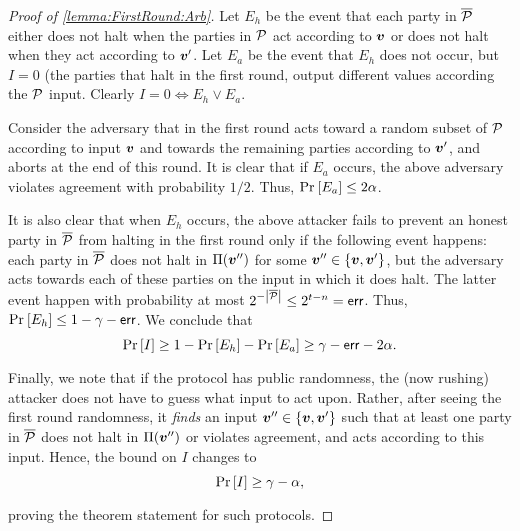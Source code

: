 \begin{proof}[Proof of \cref{lemma:FirstRound:Arb}]
  Let $E_h$ be the event that  each party  in ${\overline{\mathcal{P}}}$ either does not halt when the parties in $\mathcal{P}$ act according to ${ \boldsymbol{v}}$ or does not halt when they act according to ${ \boldsymbol{v}}'$. Let $E_a$ be the event that $E_h$ does not occur, but $I = 0$  (\ie the parties that halt in the first round, output different values according the $\mathcal{P}$ input.  Clearly $I = 0  \Longleftrightarrow E_h \lor  E_a$.

Consider the  adversary  that in the first round acts toward a random subset of $\mathcal{P}$ according to input ${ \boldsymbol{v}}$ and towards the remaining parties according to  ${ \boldsymbol{v}}'$, and  aborts at the end of this  round. It is  clear that  if $E_a$ occurs, the  above adversary violates agreement with probability $1/2$. Thus, $\Pr_{}\left[E_a\right] \le 2\alpha$.

It is also clear that when $E_h$ occurs, the above attacker  fails to prevent an honest party
in ${\overline{\mathcal{P}}}$ from halting in the first round only if the following event happens:  each party in ${\overline{\mathcal{P}}} $ does not halt in $\Pi({ \boldsymbol{v}}'')$ for some ${ \boldsymbol{v}}'' \in \left\{{ \boldsymbol{v}},{ \boldsymbol{v}}'\right\}$, but the adversary acts towards each of these parties on the input in which it does halt. The latter event happen with probability at most  $2^{-\left|{\overline{\mathcal{P}}}\right|} \le 2^{t-n} = \mathsf{err}$. Thus, $\Pr_{}\left[E_h\right] \le 1 - \gamma - \mathsf{err}$. We conclude that
\begin{align*}
	\Pr_{}\left[I\right] \ge  1 - \Pr_{}\left[E_h\right] - \Pr_{}\left[E_a\right] \ge \gamma - \mathsf{err}  - 2\alpha.
\end{align*}
Finally, we note that if the protocol has public randomness, the (now rushing) attacker does not have to guess what input to act upon.
Rather, after seeing the first round randomness, it  \emph{finds}  an input ${ \boldsymbol{v}}'' \in\left\{{ \boldsymbol{v}},{ \boldsymbol{v}}'\right\}$ such that at least one party in ${\overline{\mathcal{P}}}$ does not halt in $\Pi({ \boldsymbol{v}}'')$ or violates agreement, and acts according to this input. Hence, the bound on $I$ changes to
\begin{align*}
\Pr_{}\left[I\right] \ge \gamma - \alpha,
\end{align*}
proving the theorem statement for such protocols.
\end{proof}
